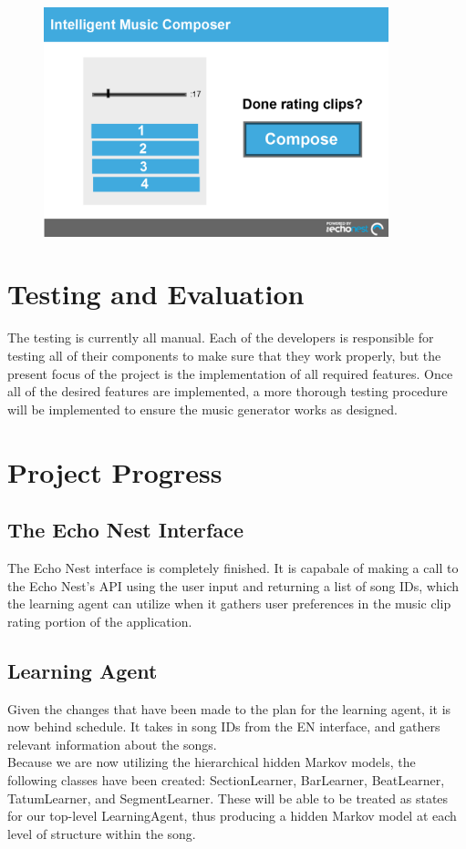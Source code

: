 \documentclass{article}
\begin{document}
\begin{figure}[H]
\centerline{\includegraphics[width=10cm]{compose.png}}
\end{figure}

\section{Testing and Evaluation}
The testing is currently all manual. Each of the developers is responsible for testing all of their
components to make sure that they work properly, but the present focus of the project is the 
implementation of all required features. Once all of the desired features are implemented, a
more thorough testing procedure will be implemented to ensure the music generator works as designed.

\section{Project Progress}
\subsection{The Echo Nest Interface}
The Echo Nest interface is completely finished.  It is capabale of making a call to the Echo Nest's API using the 
user input and returning a list of song IDs, which the learning agent can utilize when it gathers user preferences
in the music clip rating portion of the application.

\subsection{Learning Agent}
Given the changes that have been made to the plan for the learning agent, it is now behind schedule.
It takes in song IDs from the EN interface, and gathers relevant information about the songs.
\\
Because we are now utilizing the hierarchical hidden Markov models, the following classes have been created:
SectionLearner, BarLearner, BeatLearner, TatumLearner, and SegmentLearner. These will be able to be treated as
states for our top-level LearningAgent, thus producing a hidden Markov model at each level of structure within  
the song.
\end{document}
